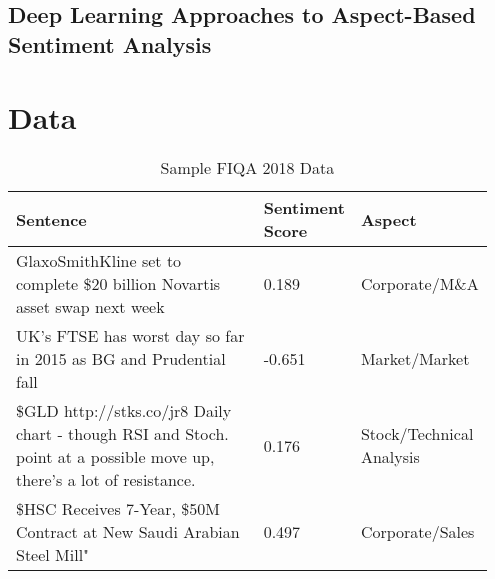 \documentclass[11pt,a4paper,titlepage]{article}
\begin{document}
\subsection{Deep Learning Approaches to Aspect-Based Sentiment Analysis}














\section{Data}

\renewcommand{\arraystretch}{1.5}
\begin{table*}
  \small
  \caption{Sample FIQA 2018 Data}
  \label{sample-data}
  \centering
  \begin{tabular}{p{0.65\linewidth} | p{0.09\linewidth} | p{0.21\linewidth}}
    \toprule
    Sentence     & Sentiment Score     & Aspect \\
    \midrule
    GlaxoSmithKline set to complete \$20 billion Novartis asset swap next week                                                 & 0.189  & Corporate/M\&A           \\
    UK's FTSE has worst day so far in 2015 as BG and Prudential fall                                                           & -0.651 & Market/Market            \\
    \$GLD http://stks.co/jr8 Daily chart - though RSI and Stoch. point at a possible move up, there's a lot of resistance.     & 0.176  & Stock/Technical Analysis \\
    \$HSC Receives 7-Year, \$50M Contract at New Saudi Arabian Steel Mill"                                                     & 0.497  & Corporate/Sales          \\
    \bottomrule
  \end{tabular}
\end{table*}
\end{document}
